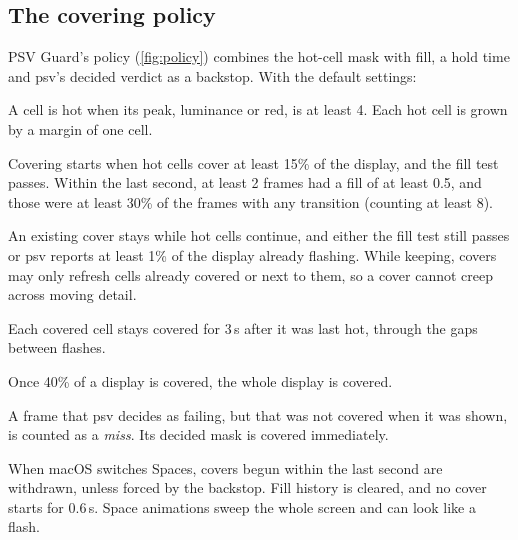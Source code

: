 \documentclass[11pt,a4paper]{article}
\newcommand{\psv}{\textsf{psv}}
\newcommand{\guard}{PSV Guard}
\begin{document}
\subsection{The covering policy}

\guard{}'s policy (\cref{fig:policy}) combines the hot-cell mask with fill, a hold time and \psv{}'s decided verdict as a backstop. With the default settings:

\begin{description}[font=\bfseries\color{ink}]
  \item[Hot.] A cell is hot when its peak, luminance or red, is at least 4. Each hot cell is grown by a margin of one cell.
  \item[Start.] Covering starts when hot cells cover at least 15\% of the display, and the fill test passes. Within the last second, at least 2 frames had a fill of at least 0.5, and those were at least 30\% of the frames with any transition (counting at least 8).
  \item[Keep.] An existing cover stays while hot cells continue, and either the fill test still passes or \psv{} reports at least 1\% of the display already flashing. While keeping, covers may only refresh cells already covered or next to them, so a cover cannot creep across moving detail.
  \item[Hold.] Each covered cell stays covered for 3\,s after it was last hot, through the gaps between flashes.
  \item[Whole display.] Once 40\% of a display is covered, the whole display is covered.
  \item[Backstop.] A frame that \psv{} decides as failing, but that was not covered when it was shown, is counted as a \emph{miss}. Its decided mask is covered immediately.
  \item[System transitions.] When macOS switches Spaces, covers begun within the last second are withdrawn, unless forced by the backstop. Fill history is cleared, and no cover starts for 0.6\,s. Space animations sweep the whole screen and can look like a flash.
\end{description}
\end{document}
